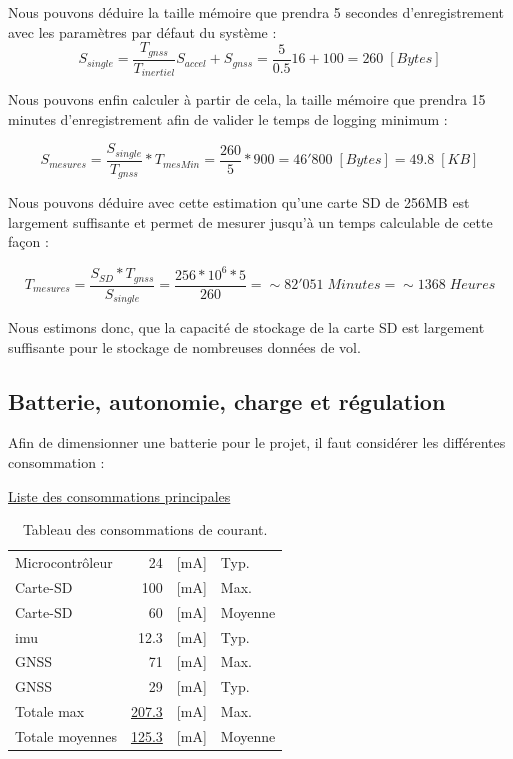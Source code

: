 Nous pouvons déduire la taille mémoire que prendra 5 secondes d'enregistrement avec les paramètres par défaut du système : 
\begin{equation*}
	S_{single} = \frac{T_{gnss}}{T_{inertiel}}S_{accel} + S_{gnss} = \frac{5}{0.5}16 + 100 = 260 \; [Bytes]
\end{equation*}

Nous pouvons enfin calculer à partir de cela, la taille mémoire que prendra 15 minutes d'enregistrement afin de valider le temps de logging minimum : 

\begin{equation*}
	S_{mesures} = \frac{S_{single}}{T_{gnss}} * T_{mesMin} = \frac{260}{5} * 900 = 46'800 \; [Bytes] = 49.8 \; [KB]
\end{equation*}

Nous pouvons déduire avec cette estimation qu'une carte SD de 256MB est largement suffisante et permet de mesurer jusqu'à un temps calculable de cette façon :

\begin{equation*}
	T_{mesures} = \frac{S_{SD}*T_{gnss}}{S_{single}} = \frac{256*10^6*5}{260} = \sim82'051 \; Minutes = \sim1368 \; Heures
\end{equation*}

Nous estimons donc, que la capacité de stockage de la carte SD est largement suffisante pour le stockage de nombreuses données de vol.

\clearpage

\subsection{Batterie, autonomie, charge et régulation} 
Afin de dimensionner une batterie pour le projet, il faut considérer les différentes consommation :

\begin{center}
	\underline{Liste des consommations principales} \\
	\begin{table}[h]
		\centering
		\begin{tabular}{lrll}
			Microcontrôleur & 24 & [mA] & Typ. \\
			Carte-SD & ~100 & [mA] & Max. \\
			Carte-SD & ~60 & [mA] & Moyenne \\
			\gls{imu} & 12.3 & [mA] & Typ. \\
			\gls{GNSS} & 71 & [mA] & Max. \\
			\gls{GNSS} & 29 & [mA] & Typ. \\
			\hline
			Totale max & \underline{207.3} & [mA] & Max. \\
			Totale moyennes & \underline{125.3} & [mA] & Moyenne \\
			\hline
		\end{tabular}
		\caption{Tableau des consommations de courant.}
		\label{tab:consommateur}
	\end{table}
\end{center}

